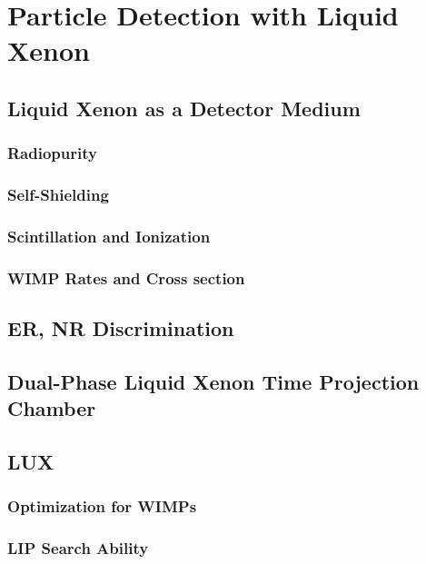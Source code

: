 \chapter{Particle Detection with Liquid Xenon}

\label{ch:LXeTPCs} %

\section{Liquid Xenon as a Detector Medium}
\subsection{Radiopurity}
\subsection{Self-Shielding}
\subsection{Scintillation and Ionization}
\subsection{WIMP Rates and Cross section}

\section{ER, NR Discrimination}

\section{Dual-Phase Liquid Xenon Time Projection Chamber}

\section{LUX}
\subsection{Optimization for WIMPs}
\subsection{LIP Search Ability}


